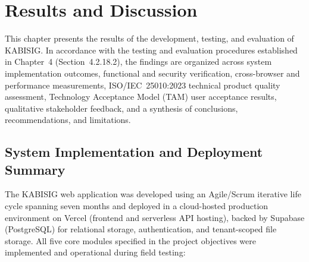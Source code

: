\chapter{Results and Discussion}
\label{chap:results_and_discussion}

\hspace*{\parindent}This chapter presents the results of the development, testing, and evaluation of KABISIG. In accordance with the testing and evaluation procedures established in Chapter~4 (Section~4.2.18.2), the findings are organized across system implementation outcomes, functional and security verification, cross-browser and performance measurements, ISO/IEC~25010:2023 technical product quality assessment, Technology Acceptance Model (TAM) user acceptance results, qualitative stakeholder feedback, and a synthesis of conclusions, recommendations, and limitations.

\section{System Implementation and Deployment Summary}
\label{sec:system_implementation_and_deployment_summary}

\hspace*{\parindent}The KABISIG web application was developed using an Agile/Scrum iterative life cycle spanning seven months and deployed in a cloud-hosted production environment on Vercel (frontend and serverless API hosting), backed by Supabase (PostgreSQL) for relational storage, authentication, and tenant-scoped file storage. All five core modules specified in the project objectives were implemented and operational during field testing:

